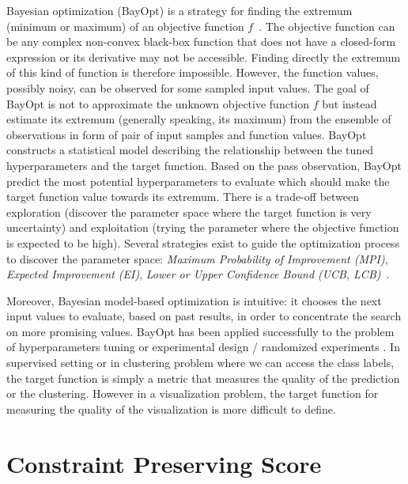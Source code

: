 Bayesian optimization (BayOpt) is a strategy for finding the extremum (minimum or maximum) of an objective function $f$~\cite{mockus1974BO}.
The objective function can be any complex non-convex black-box function that does not have a closed-form expression or its derivative may not be accessible.
Finding directly the extremum of this kind of function is therefore impossible.
However, the function values, possibly noisy, can be observed for some sampled input values.
The goal of BayOpt is not to approximate the unknown objective function $f$ but instead estimate its extremum (generally speaking, its maximum) from the ensemble of observations
in form of pair of input samples and function values.
BayOpt constructs a statistical model describing the relationship between
the tuned hyperparameters and the target function.
Based on the pass observation, BayOpt predict the most potential hyperparameters to evaluate which should make the target function value towards its extremum.
There is a trade-off between exploration (discover the parameter space where the target function is very uncertainty) and exploitation (trying the parameter where the objective function is expected to be high).
Several strategies exist to guide the optimization process to discover the parameter space: \emph{Maximum Probability of Improvement (MPI)}, \emph{Expected Improvement (EI)}, \emph{Lower or Upper Confidence Bound (UCB, LCB)}~\cite{brochu2010tutorial}.

Moreover, Bayesian model-based optimization is intuitive: it chooses the next input values to evaluate, based on past results, in order to concentrate the search on more promising values. BayOpt has been applied successfully to the problem of hyperparameters tuning \cite{snoek2012practical} or experimental design / randomized experiments \cite{letham2019constrained}.
In supervised setting or in clustering problem where we can access the class labels, the target function is simply a metric that measures the quality of the prediction or the clustering.
However in a visualization problem, the target function for measuring the quality of the visualization is more difficult to define.

\section{Constraint Preserving Score}\label{sec:proposed_method}

